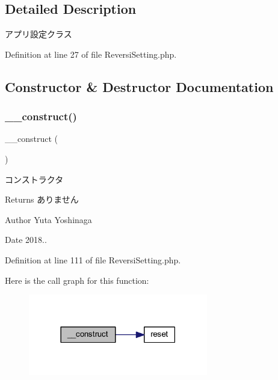 \subsection{Detailed Description}
アプリ設定クラス 

Definition at line 27 of file Reversi\+Setting.\+php.



\subsection{Constructor \& Destructor Documentation}
\mbox{\label{class_reversi_setting_a095c5d389db211932136b53f25f39685}} 
\subsubsection{\texorpdfstring{\+\_\+\+\_\+construct()}{\_\_construct()}}
{\footnotesize\ttfamily \+\_\+\+\_\+construct (\begin{DoxyParamCaption}{ }\end{DoxyParamCaption})}



コンストラクタ 

\begin{DoxyReturn}{Returns}
ありません 
\end{DoxyReturn}
\begin{DoxyAuthor}{Author}
Yuta Yoshinaga 
\end{DoxyAuthor}
\begin{DoxyDate}{Date}
2018.. 
\end{DoxyDate}


Definition at line 111 of file Reversi\+Setting.\+php.

Here is the call graph for this function\+:
\nopagebreak
\begin{figure}[H]
\begin{center}
\leavevmode
\includegraphics[width=222pt]{class_reversi_setting_a095c5d389db211932136b53f25f39685_cgraph}
\end{center}
\end{figure}
\mbox{\label{class_reversi_setting_a421831a265621325e1fdd19aace0c758}} 
